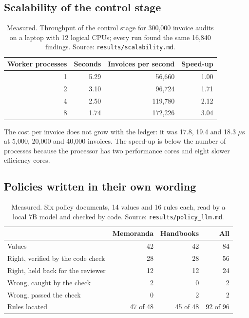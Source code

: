 \documentclass[11pt,a4paper]{article}
\begin{document}
\subsection{Scalability of the control stage}
\begin{table}[htbp]
\caption{Measured. Throughput of the control stage for 300,000 invoice audits on a laptop with 12 logical CPUs; every run found the same 16,840 findings. Source: \texttt{results/scalability.md}.}
\label{tab:scal}
\centering
\small
\begin{tabular}{rrrr}
\toprule
Worker processes & Seconds & Invoices per second & Speed-up \\
\midrule
1 & 5.29 & 56,660 & 1.00 \\
2 & 3.10 & 96,724 & 1.71 \\
4 & 2.50 & 119,780 & 2.12 \\
8 & 1.74 & 172,226 & 3.04 \\
\bottomrule
\end{tabular}
\end{table}

The cost per invoice does not grow with the ledger: it was 17.8, 19.4 and 18.3 $\mu$s at 5,000, 20,000 and 40,000 invoices. The speed-up is below the number of processes because the processor has two performance cores and eight slower efficiency cores.

\subsection{Policies written in their own wording}
\begin{table}[htbp]
\caption{Measured. Six policy documents, 14 values and 16 rules each, read by a local 7B model and checked by code. Source: \texttt{results/policy\_llm.md}.}
\label{tab:freeform}
\centering
\small
\begin{tabular}{L{6.2cm}rrr}
\toprule
 & Memoranda & Handbooks & All \\
\midrule
Values & 42 & 42 & 84 \\
Right, verified by the code check & 28 & 28 & 56 \\
Right, held back for the reviewer & 12 & 12 & 24 \\
Wrong, caught by the check & 2 & 0 & 2 \\
Wrong, passed the check & 0 & 2 & 2 \\
Rules located & 47 of 48 & 45 of 48 & 92 of 96 \\
\bottomrule
\end{tabular}
\end{table}
\end{document}
